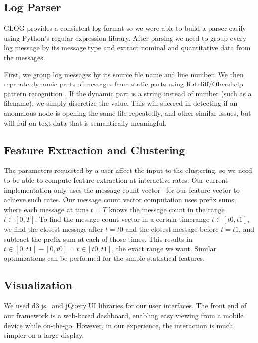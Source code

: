\documentclass[conference]{style/acmsiggraph}
\begin{document}
\subsection{Log Parser}
GLOG provides a consistent log format so we were able to build a parser easily using Python's regular expression
library. After parsing we need to group every log message by its message type and extract nominal and
quantitative data from the messages.

First, we group log messages by its source file name and line number.
We then separate dynamic parts of messages from static parts using Ratcliff/Obershelp pattern recognition \cite{pattermatch}.
If the dynamic part is a string instead of number (such as a filename), we simply discretize the value.
This will succeed in detecting if an anomalous node is opening the same file repeatedly, and other similar issues, but will fail on text data that is semantically meaningful.

\subsection{Feature Extraction and Clustering}
The parameters requested by a user affect the input to the clustering, so we need to be able to compute feature extraction at interactive rates.
Our current implementation only uses the message count vector~\cite{Xu09} for our feature vector to achieve such rates.
Our message count vector computation uses prefix sums, where each message at time $t=T$ knows the message count in the range $t \in [0, T]$.
To find the message count vector in a certain timerange $t \in [t0, t1]$, we find the closest message after $t=t0$ and the closest message before $t=t1$, and subtract the prefix sum at each of those times.
This results in $t \in [0,t1] - [0,t0] = t \in [t0,t1]$, the exact range we want.
Similar optimizations can be performed for the simple statistical features.

\subsection{Visualization}

We used d3.js~\cite{D311} and jQuery UI libraries for our user interfaces.
The front end of our framework is a web-based dashboard, enabling easy viewing from a mobile device while on-the-go.
However, in our experience, the interaction is much simpler on a large display.
\end{document}
